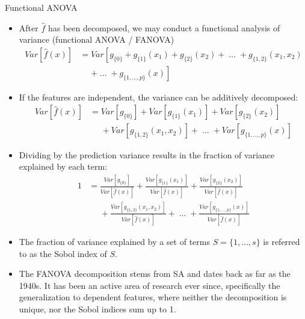 \documentclass[11pt,compress,t,notes=noshow, xcolor=table]{beamer}
\newcommand{\predvar}{Var\left[\hat{f}(x)\right]}
\begin{document}
\begin{vbframe}{Functional ANOVA}
\begin{itemize}
\item
After $\hat{f}$ has been decomposed, we may conduct a functional analysis of variance (functional ANOVA / FANOVA)
\begin{align*}
Var\left[\hat{f}(x)\right] &= Var\left[g_{\{0\}} + g_{\{1\}}(x_1) + g_{\{2\}}(x_2) + \;\dots\; + g_{\{1, 2\}}(x_1, x_2) \right. \\
&\phantom{{}={}} \left. + \;\dots\; + g_{\{1,\ldots,p\}}(x) \right]
\end{align*}
\item If the features are independent, the variance can be additively decomposed:
\begin{align*}
Var\left[\hat{f}(x)\right] &= Var\left[g_{\{0\}}\right] + Var\left[g_{\{1\}}(x_1)\right] + Var\left[g_{\{2\}}(x_2)\right] \\
&\phantom{{}={}} + Var\left[g_{\{1, 2\}}(x_1, x_2)\right] + \;\dots\; + Var\left[g_{\{1,\ldots,p\}}(x)\right] 
\end{align*}
\item Dividing by the prediction variance results in the fraction of variance explained by each term:
\begin{align*}
1 &= \frac{Var\left[g_{\{0\}}\right]}{\predvar} + \frac{Var\left[g_{\{1\}}(x_1)\right]}{\predvar} + \frac{Var\left[g_{\{2\}}(x_2)\right]}{\predvar} \\
&\phantom{{}={}} + \frac{Var\left[g_{\{1, 2\}}(x_1, x_2)\right]}{\predvar} + \;\dots\; + \frac{Var\left[g_{\{1,\ldots,p\}}(x)\right]}{\predvar} 
\end{align*}
\item The fraction of variance explained by a set of terms $S = \{1, \dots, s\}$ is referred to as the Sobol index of $S$.
\item The FANOVA decomposition stems from SA and dates back as far as the 1940s. It has been an active area of research ever since, specifically the generalization to dependent features, where neither the decomposition is unique, nor the Sobol indices sum up to 1.
\end{itemize}

\end{vbframe}


\endlecture
\end{document}
